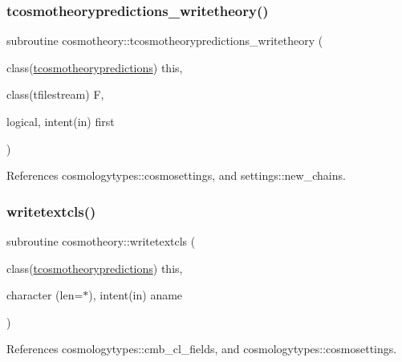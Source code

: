\mbox{\label{namespacecosmotheory_a4ff659fbb6df4ea03d45ef993ec6dd32}} 
\subsubsection{\texorpdfstring{tcosmotheorypredictions\+\_\+writetheory()}{tcosmotheorypredictions\_writetheory()}}
{\footnotesize\ttfamily subroutine cosmotheory\+::tcosmotheorypredictions\+\_\+writetheory (\begin{DoxyParamCaption}\item[{class(\mbox{\hyperlink{structcosmotheory_1_1tcosmotheorypredictions}{tcosmotheorypredictions}})}]{this,  }\item[{class(tfilestream)}]{F,  }\item[{logical, intent(in)}]{first }\end{DoxyParamCaption})\hspace{0.3cm}{\ttfamily [private]}}



References cosmologytypes\+::cosmosettings, and settings\+::new\+\_\+chains.

\mbox{\label{namespacecosmotheory_aa5b006674819db6a4859e0e709fbd275}} 
\subsubsection{\texorpdfstring{writetextcls()}{writetextcls()}}
{\footnotesize\ttfamily subroutine cosmotheory\+::writetextcls (\begin{DoxyParamCaption}\item[{class(\mbox{\hyperlink{structcosmotheory_1_1tcosmotheorypredictions}{tcosmotheorypredictions}})}]{this,  }\item[{character (len=$\ast$), intent(in)}]{aname }\end{DoxyParamCaption})\hspace{0.3cm}{\ttfamily [private]}}



References cosmologytypes\+::cmb\+\_\+cl\+\_\+fields, and cosmologytypes\+::cosmosettings.

